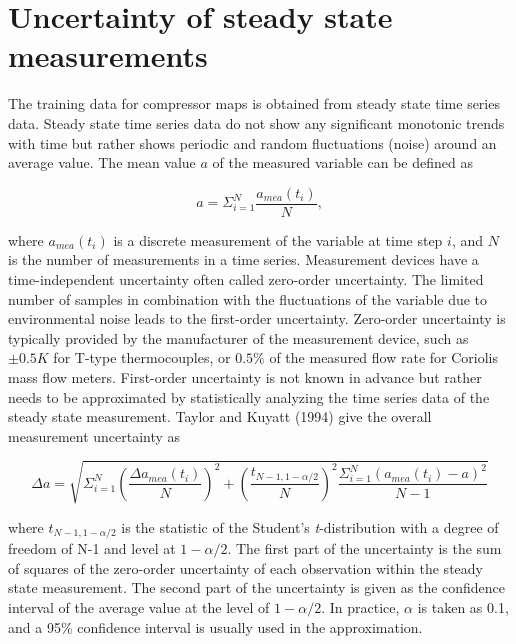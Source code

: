 \section{Uncertainty of steady state measurements}
\label{sec:unc_steady}
The training data for compressor maps is obtained from steady state time series data. Steady state time series data do not show any significant monotonic trends with time but rather shows periodic and random fluctuations (noise) around an average value. The mean value $a$ of the measured variable can be defined as

\begin{equation}
a = \Sigma _{i = 1}^N{\frac{{{a_{mea}}({t_i})}}{N}},
\label{eq:avg_mea}
\end{equation}

where $a_{mea}(t_i)$ is a discrete measurement of the variable at time step $i$, and $N$ is the number of measurements in a time series. Measurement devices have a time-independent uncertainty often called zero-order uncertainty. The limited number of samples in combination with the fluctuations of the variable due to environmental noise leads to the first-order uncertainty.  Zero-order uncertainty is typically provided by the manufacturer of the measurement device, such as $\pm0.5K$ for T-type thermocouples, or $0.5\%$ of the measured flow rate for Coriolis mass flow meters. First-order uncertainty is not known in advance but rather needs to be approximated by statistically analyzing the time series data of the steady state measurement. Taylor and Kuyatt (1994)\cite{Kamei:1995} give the overall measurement uncertainty as

\begin{equation}
\Delta a = \sqrt {\Sigma _{i = 1}^N{{\left(\frac{{\Delta {a_{mea}}({t_i})}}{N}\right)}^2} + {{\left(\frac{{{t_{N - 1,1 - \alpha /2}}}}{N}\right)}^2}\frac{{\Sigma _{i = 1}^N{{\left({a_{mea}}({t_i}) - a\right)}^2}}}{{N - 1}}} 
\label{eq:mea_unc_TK}
\end{equation}

where $t_{N-1,1-\alpha/2}$ is the statistic of the Student's \emph{t}-distribution with a degree of freedom of N-1 and level at $1-\alpha/2$. The first part of the uncertainty is the sum of squares of the zero-order uncertainty of each observation within the steady state measurement. The second part of the uncertainty is given as the confidence interval of the average value at the level of $1-\alpha/2$. In practice, $\alpha$ is taken as 0.1, and a 95\% confidence interval is usually used in the approximation.